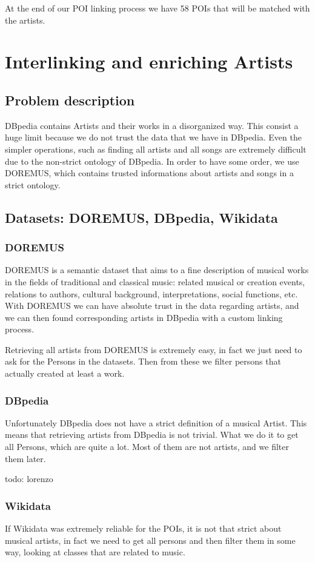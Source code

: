 \documentclass[paper=a4, fontsize=11pt]{scrartcl}
\begin{document}
At the end of our POI linking process we have 58 POIs that will be matched with the artists.

\section{Interlinking and enriching Artists}
\subsection{Problem description}
DBpedia contains Artists and their works in a disorganized way.
This consist a huge limit because we do not trust the data that we have in DBpedia. Even the simpler operations, such as finding all artists and all songs are extremely difficult due to the non-strict ontology of DBpedia. In order to have some order, we use DOREMUS, which contains trusted informations about artists and songs in a strict ontology.

\subsection{Datasets: DOREMUS, DBpedia, Wikidata}
\subsubsection{DOREMUS}
DOREMUS is a semantic dataset that aims to a fine description of musical works in the fields of traditional and classical music: related musical or creation events, relations to authors, cultural background, interpretations, social functions, etc.
With DOREMUS we can have absolute trust in the data regarding artists, and we can then found corresponding artists in DBpedia with a custom linking process.

Retrieving all artists from DOREMUS is extremely easy, in fact we just need to ask for the Persons in the datasets. Then from these we filter persons that actually created at least a work.

\subsubsection{DBpedia}
Unfortunately DBpedia does not have a strict definition of a musical Artist. This means that retrieving artists from DBpedia is not trivial. What we do it to get all Persons, which are quite a lot. Most of them are not artists, and we filter them later.

todo: lorenzo


\subsubsection{Wikidata}
If Wikidata was extremely reliable for the POIs, it is not that strict about musical artists, in fact we need to get all persons and then filter them in some way, looking at classes that are related to music.
\end{document}
